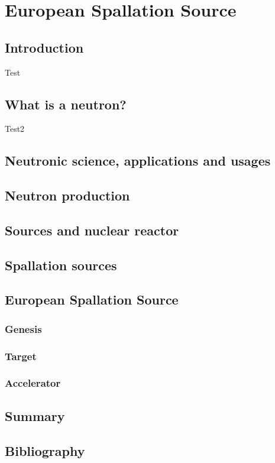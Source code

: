 \chapter{European Spallation Source}
\cleardoublepage

\minitoc

\section{Introduction}
\begin{refsection}
\label{ch1:Introduction}
Test \cite{Mason2005}
\lipsum

\section{What is a neutron?}
\label{ch1:s:Neutron}
Test2 \cite{osti_656719}
\lipsum

\section{Neutronic science, applications and usages}
\lipsum

\section{Neutron production}
\lipsum

\section{Sources and nuclear reactor}
\lipsum

\section{Spallation sources}
\lipsum

\section{European Spallation Source}
\lipsum

\subsection{Genesis}
\lipsum

\subsection{Target}
\lipsum

\subsection{Accelerator}
\lipsum

\section{Summary}
\label{ch1:Summary}
\lipsum

\cleardoublepage
\section{Bibliography}
\label{ch1:bib}
\printbibliography[heading=subbibliography]
\end{refsection}